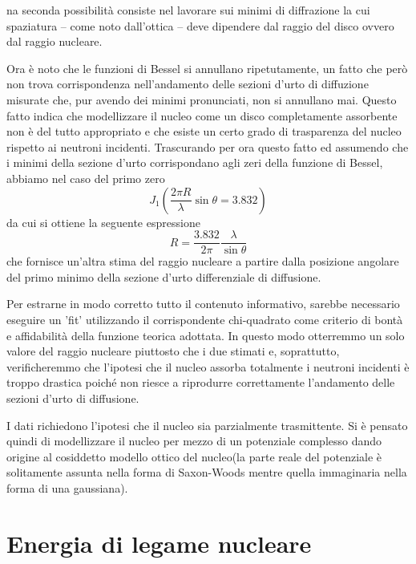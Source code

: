 na seconda possibilità consiste nel lavorare sui minimi di diffrazione la cui spaziatura -- come noto dall'ottica -- deve dipendere dal raggio del disco ovvero dal raggio nucleare.

Ora è noto che le funzioni di Bessel si annullano ripetutamente, un fatto che però non trova corrispondenza nell'andamento delle sezioni d'urto di diffuzione misurate che, pur avendo dei minimi pronunciati, non si annullano mai.
Questo fatto indica che modellizzare il nucleo come un disco completamente assorbente non è del tutto appropriato e che esiste un certo grado di trasparenza del nucleo rispetto ai neutroni incidenti.
Trascurando per ora questo fatto ed assumendo che i minimi della sezione d'urto corrispondano agli zeri della funzione di Bessel, abbiamo nel caso del primo zero \[
	J_{1}\left( \frac{2 \pi R}{\lambda}\sin \theta = 3.832 \right)
\] da cui si ottiene la seguente espressione \[
	R = \frac{3.832}{2 \pi} \frac{\lambda}{\sin \theta}
\] che fornisce un'altra stima del raggio nucleare a partire dalla posizione angolare del primo minimo della sezione d'urto differenziale di diffusione.

Per estrarne in modo corretto tutto il contenuto informativo, sarebbe necessario eseguire un 'fit' utilizzando il corrispondente chi-quadrato come criterio di bontà e affidabilità della funzione teorica adottata.
In questo modo otterremmo un solo valore del raggio nucleare piuttosto che i due stimati e, soprattutto, verificheremmo che l'ipotesi che il nucleo assorba totalmente i neutroni incidenti è troppo drastica poiché non riesce a riprodurre correttamente l'andamento delle sezioni d'urto di diffusione.

I dati richiedono l'ipotesi che il nucleo sia parzialmente trasmittente.
Si è pensato quindi di modellizzare il nucleo per mezzo di un potenziale complesso dando origine al cosiddetto modello ottico del nucleo(la parte reale del potenziale è solitamente assunta nella forma di Saxon-Woods mentre quella immaginaria nella forma di una gaussiana).
\section{Energia di legame nucleare}\label{sec:energia-di-legame-nucleare}


